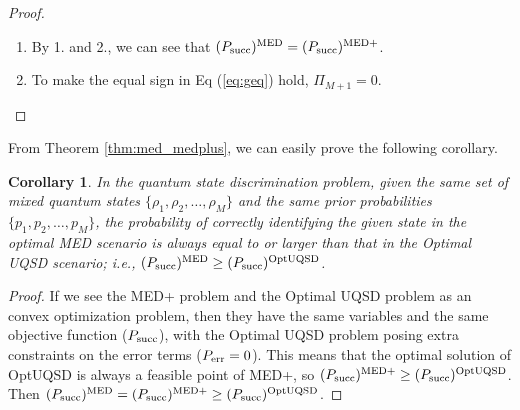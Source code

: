 \documentclass[11pt]{article}
\newtheorem{corollary}{Corollary}
\newcommand{\psucc}{P_{\textnormal{succ}}}
\newcommand{\perr}{P_{\textnormal{err}}}
\newcommand{\povm}[1]{\textnormal{POVM}_{\textnormal{#1}}}
\newcommand{\PiSet}[1]{\left\{ \Pi_1, \Pi_2, \dots, \Pi_{#1} \right\}}
\newcommand{\PiSetPrime}[1]{\left\{ \Pi_1', \Pi_2', \dots, \Pi_{#1}' \right\}}
\newcommand{\supmed}{^{\textnormal{MED}}}
\newcommand{\supmedplus}{^{\textnormal{MED+}}}
\newcommand{\supuqsd}{^{\textnormal{OptUQSD}}}
\begin{document}
\begin{proof}
\begin{enumerate}
              $\povm{MED+} \equiv \PiSet{M+1} \in \povm{M+1}$.
              We can construct $P \equiv \PiSetPrime{M} \in \povm{M}$ by
              \begin{align*}
                  \Pi_{1}' = \Pi_{1}, \; \Pi_{2}' = \Pi_{2}, \; \dots,
                  \; \Pi_{M}' = \Pi_{M} + \Pi_{M+1}
              \end{align*}
              Then,
              \begin{align}
                  (\psucc)\supmed & \geq (\psucc)^{P}
                  = \sum_{i=1}^{M} p_{i} \operatorname{tr}(\rho_{i} \Pi_{i}')                           \\
                                  & = \sum_{i=1}^{M} p_{i} \operatorname{tr}(\rho_{i} \Pi_{i})
                  + p_{M} \operatorname{tr}(\rho_{i} \Pi_{M+1})                                         \\
                                  & = (\psucc)\supmedplus + p_{M} \operatorname{tr}(\rho_{i} \Pi_{M+1}) \\
                                  & \geq (\psucc)\supmedplus \label{eq:geq}
              \end{align}
        \item By 1. and 2., we can see that $(\psucc)\supmed = (\psucc)\supmedplus$.
        \item To make the equal sign in Eq (\ref{eq:geq}) hold, $\Pi_{M+1} = 0$.
    \end{enumerate}
\end{proof}

From Theorem \ref{thm:med_medplus}, we can easily prove the
following corollary.
\begin{corollary}
    In the quantum state discrimination problem, given the same set of
    mixed quantum states $\{ \rho_{1}, \rho_{2}, \dots, \rho_{M} \}$
    and the same prior probabilities $\{p_{1}, p_{2}, \dots, p_{M}\}$, the probability of correctly identifying the given state in the optimal MED scenario is always equal to or larger than that in the Optimal UQSD scenario; i.e.,
    $(\psucc)\supmed \geq (\psucc)\supuqsd$.
\end{corollary}

\begin{proof}
    If we see the MED+ problem and the Optimal UQSD problem as an convex
    optimization problem, then they have the same variables and the same
    objective function ($\psucc$), with the Optimal UQSD problem posing extra
    constraints on the error terms ($\perr = 0$).
    This means that the optimal solution of OptUQSD is always a feasible point
    of MED+, so $(\psucc)\supmedplus \geq (\psucc)\supuqsd$.
    Then $(\psucc)\supmed = (\psucc)\supmedplus \geq (\psucc)\supuqsd$.
\end{proof}
\end{document}

